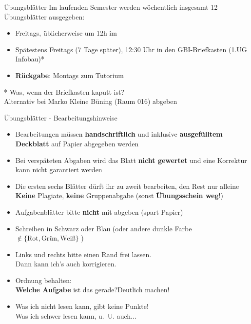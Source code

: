 \begin{frame}{Übungsblätter}
	Im laufenden Semester werden wöchentlich insgesamt 12 Übungsblätter ausgegeben:
	\begin{itemize}
		\item {} Freitags, üblicherweise um 12h im \ILIAS \\
		\item {} Spätestens Freitags (7 Tage später), 12:30 Uhr in den GBI-Briefkasten (1.UG Infobau)*
		\item \textbf{Rückgabe}: Montags zum Tutorium
	\end{itemize}
	\pause	
	* Was, wenn der Briefkasten kaputt ist? \\
	\impl Alternativ bei Marko Kleine Büning (Raum 016) abgeben \\
\end{frame}

\begin{frame}{Übungsblätter - Bearbeitungshinweise}
	\begin{itemize}
		\item Bearbeitungen müssen \textbf{handschriftlich} und inklusive \textbf{ausgefülltem Deckblatt} auf Papier abgegeben werden \\
		\pause
		\item Bei verspäteten Abgaben wird das Blatt \textbf{nicht gewertet} und eine Korrektur kann nicht garantiert werden
		\pause
		\item Die ersten sechs Blätter dürft ihr zu zweit bearbeiten, den Rest nur alleine
		\implitem \textbf{Keine} Plagiate, \textbf{keine} Gruppenabgabe (sonst \textbf{Übungsschein weg}!)
		\pause
		\item Aufgabenblätter bitte \textbf{nicht} mit abgeben (spart Papier)
		\pause
		\item Schreiben in Schwarz oder Blau (oder andere dunkle Farbe $\notin \{\text{Rot}, \text{Grün}, \text{Weiß}\}$ )	
		\item Links und rechts bitte einen Rand frei lassen. \\
			  Dann kann ich's auch korrigieren. \smiley
		\item Ordnung behalten: \\
			  \textbf{Welche Aufgabe} ist das gerade?\quad \impl Deutlich machen!
		\item Was ich nicht lesen kann, gibt keine Punkte! \\
			  \small Was ich schwer lesen kann, u.~U. auch... 
	\end{itemize}
\end{frame}



